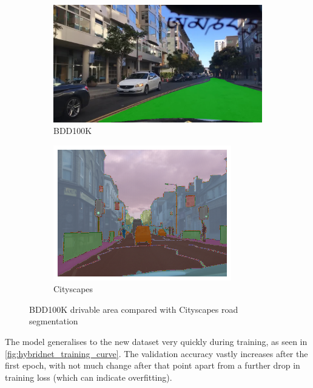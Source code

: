 \begin{figure}[b]
    \centering
    \begin{subfigure}{.45\textwidth}
        \centering
        \includegraphics[width=\linewidth]{images/bdd100k.jpg}
        \caption{BDD100K}
    \end{subfigure}
    \quad
    \begin{subfigure}{.45\textwidth}
        \centering
        \includegraphics[width=\linewidth]{images/cityscapes.png}
        \caption{Cityscapes}
    \end{subfigure}
    \caption{BDD100K drivable area compared with Cityscapes road segmentation}
    \label{fig:dataset_comparison}
\end{figure}

The model generalises to the new dataset very quickly during training,
as seen in \cref{fig:hybridnet_training_curve}. The validation accuracy vastly
increases after the first epoch, with not much change after that point
apart from a further drop in training loss (which can indicate overfitting).

